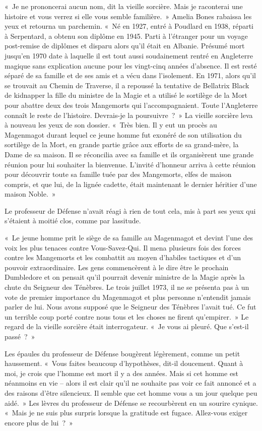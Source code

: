 «~Je ne prononcerai aucun nom, dit la vieille sorcière.
Mais je raconterai une histoire et vous verrez si elle vous semble familière.~»
Amelia Bones rabaissa les yeux et retourna un parchemin.
«~Né en 1927, entré à Poudlard en 1938, réparti à Serpentard, a obtenu son diplôme en 1945.
Parti à l'étranger pour un voyage post-remise de diplômes et disparu alors qu'il était en Albanie.
Présumé mort jusqu'en 1970 date à laquelle il est tout aussi soudainement rentré en Angleterre magique sans explication aucune pour les vingt-cinq années d'absence.
Il est resté séparé de sa famille et de ses amis et a vécu dans l'isolement.
En 1971, alors qu'il se trouvait au Chemin de Traverse, il a repoussé la tentative de Bellatrix Black de kidnapper la fille du ministre de la Magie et a utilisé le sortilège de la Mort pour abattre deux des trois Mangemorts qui l'accompagnaient.
Toute l'Angleterre connaît le reste de l'histoire.
Devrais-je la poursuivre~?~»
La vieille sorcière leva à nouveau les yeux de son dossier.
«~Très bien.
Il y eut un procès au Magenmagot durant lequel ce jeune homme fut exonéré de son utilisation du sortilège de la Mort, en grande partie grâce aux efforts de sa grand-mère, la Dame de sa maison.
Il se réconcilia avec sa famille et ils organisèrent une grande réunion pour lui souhaiter la bienvenue.
L'invité d'honneur arriva à cette réunion pour découvrir toute sa famille tuée par des Mangemorts, elfes de maison compris, et que lui, de la lignée cadette, était maintenant le dernier héritier d'une maison Noble.~»

Le professeur de Défense n'avait réagi à rien de tout cela, mis à part ses yeux qui s'étaient à moitié clos, comme par lassitude.

«~Le jeune homme prit le siège de sa famille au Magenmagot et devint l'une des voix les plus tenaces contre Vous-Savez-Qui.
Il mena plusieurs fois des forces contre les Mangemorts et les combattit au moyen d'habiles tactiques et d'un pouvoir extraordinaire.
Les gens commencèrent à le dire être le prochain Dumbledore et on pensait qu'il pourrait devenir ministre de la Magie après la chute du Seigneur des Ténèbres.
Le trois juillet 1973, il ne se présenta pas à un vote de premier importance du Magenmagot et plus personne n'entendit jamais parler de lui.
Nous avons supposé que le Seigneur des Ténèbres l'avait tué.
Ce fut un terrible coup porté contre nous tous et les choses ne firent qu'empirer.~»
Le regard de la vieille sorcière était interrogateur.
«~Je vous ai pleuré.
Que s'est-il passé~?~»

Les épaules du professeur de Défense bougèrent légèrement, comme un petit haussement.
«~Vous faites beaucoup d'hypothèses, dit-il doucement.
Quant à moi, je crois que l'homme est mort il y a des années.
Mais si cet homme est néanmoins en vie -- alors il est clair qu'il ne souhaite pas voir ce fait annoncé et a des raisons d'être silencieux.
Il semble que cet homme vous a un jour quelque peu aidé.~»
Les lèvres du professeur de Défense se recourbèrent en un sourire cynique.
«~Mais je ne suis plus surpris lorsque la gratitude est fugace.
Allez-vous exiger encore plus de lui~?~»

